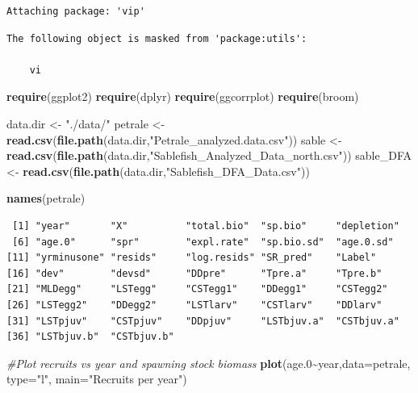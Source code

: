 \documentclass[
]{article}
\newenvironment{Shaded}{\begin{snugshade}}{\end{snugshade}}
\newcommand{\CommentTok}[1]{\textcolor[rgb]{0.56,0.35,0.01}{\textit{#1}}}
\newcommand{\DataTypeTok}[1]{\textcolor[rgb]{0.13,0.29,0.53}{#1}}
\newcommand{\FloatTok}[1]{\textcolor[rgb]{0.00,0.00,0.81}{#1}}
\newcommand{\KeywordTok}[1]{\textcolor[rgb]{0.13,0.29,0.53}{\textbf{#1}}}
\newcommand{\NormalTok}[1]{#1}
\newcommand{\OperatorTok}[1]{\textcolor[rgb]{0.81,0.36,0.00}{\textbf{#1}}}
\newcommand{\StringTok}[1]{\textcolor[rgb]{0.31,0.60,0.02}{#1}}
\begin{document}
\begin{verbatim}
Attaching package: 'vip'
\end{verbatim}

\begin{verbatim}
The following object is masked from 'package:utils':

    vi
\end{verbatim}

\begin{Shaded}
\begin{Highlighting}[]
\KeywordTok{require}\NormalTok{(ggplot2)}
\KeywordTok{require}\NormalTok{(dplyr)}
\KeywordTok{require}\NormalTok{(ggcorrplot)}
\KeywordTok{require}\NormalTok{(broom)}


\NormalTok{data.dir <{-}}\StringTok{ "./data/"}
\NormalTok{petrale <{-}}\StringTok{ }\KeywordTok{read.csv}\NormalTok{(}\KeywordTok{file.path}\NormalTok{(data.dir,}\StringTok{"Petrale\_analyzed.data.csv"}\NormalTok{))}
\NormalTok{sable <{-}}\StringTok{ }\KeywordTok{read.csv}\NormalTok{(}\KeywordTok{file.path}\NormalTok{(data.dir,}\StringTok{"Sablefish\_Analyzed\_Data\_north.csv"}\NormalTok{))}
\NormalTok{sable\_DFA <{-}}\StringTok{ }\KeywordTok{read.csv}\NormalTok{(}\KeywordTok{file.path}\NormalTok{(data.dir,}\StringTok{"Sablefish\_DFA\_Data.csv"}\NormalTok{))}

\KeywordTok{names}\NormalTok{(petrale)}
\end{Highlighting}
\end{Shaded}

\begin{verbatim}
 [1] "year"       "X"          "total.bio"  "sp.bio"     "depletion" 
 [6] "age.0"      "spr"        "expl.rate"  "sp.bio.sd"  "age.0.sd"  
[11] "yrminusone" "resids"     "log.resids" "SR_pred"    "Label"     
[16] "dev"        "devsd"      "DDpre"      "Tpre.a"     "Tpre.b"    
[21] "MLDegg"     "LSTegg"     "CSTegg1"    "DDegg1"     "CSTegg2"   
[26] "LSTegg2"    "DDegg2"     "LSTlarv"    "CSTlarv"    "DDlarv"    
[31] "LSTpjuv"    "CSTpjuv"    "DDpjuv"     "LSTbjuv.a"  "CSTbjuv.a" 
[36] "LSTbjuv.b"  "CSTbjuv.b" 
\end{verbatim}

\begin{Shaded}
\begin{Highlighting}[]
\CommentTok{\#Plot recruits vs year and spawning stock biomass}
\KeywordTok{plot}\NormalTok{(age}\FloatTok{.0}\OperatorTok{\textasciitilde{}}\NormalTok{year,}\DataTypeTok{data=}\NormalTok{petrale, }\DataTypeTok{type=}\StringTok{"l"}\NormalTok{, }\DataTypeTok{main=}\StringTok{"Recruits per year"}\NormalTok{)}
\end{Highlighting}
\end{Shaded}
\end{document}

